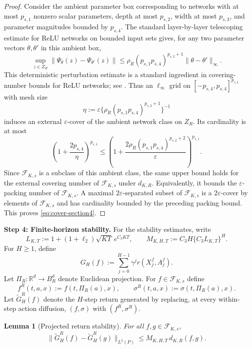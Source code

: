 \documentclass{article}
\newtheorem{lem}[thm]{Lemma}
\newcommand{\1}{\mathbbm{1}}
\numberwithin{equation}{section}
\def\to{\rightarrow}
\begin{document}
\begin{proof}
Consider the ambient parameter box corresponding to networks with at most \(p_{s,1}\) nonzero scalar parameters, depth at most \(p_{s,2}\), width at most \(p_{s,3}\), and parameter magnitudes bounded by \(p_{s,4}\). The standard layer-by-layer telescoping estimate for ReLU networks on bounded input sets gives, for any two parameter vectors \(\theta,\theta'\) in this ambient box,
\begin{equation}
\label{eq:param-lip-section4}
 \sup_{z\in Z_R}\|\Psi_\theta(z)-\Psi_{\theta'}(z)\|
 \le
 \rho_R(p_{s,1}p_{s,4})^{p_{s,2}+1}\|\theta-\theta'\|_\infty.
\end{equation}
This deterministic perturbation estimate is a standard ingredient in covering-number bounds for ReLU networks; see \cite{bartlett2019nearly,petersen2018optimal}.
Thus an \(\ell_\infty\) grid on \([-p_{s,4},p_{s,4}]^{p_{s,1}}\) with mesh size
\[
 \eta:=\varepsilon\{\rho_R(p_{s,1}p_{s,4})^{p_{s,2}+1}\}^{-1}
\]
 induces an external \(\varepsilon\)-cover of the ambient network class on \(Z_R\). Its cardinality is at most
\[
 \left(1+\frac{2p_{s,4}}{\eta}\right)^{p_{s,1}}
 \le
 \left(1+\frac{2\rho_R(p_{s,1}p_{s,4})^{p_{s,2}+2}}{\varepsilon}\right)^{p_{s,1}}.
\]
Since \(\mathcal F_{K,s}\) is a subclass of this ambient class, the same upper bound holds for the external covering number of \(\mathcal F_{K,s}\) under \(d_{K,R}\). Equivalently, it bounds the \(\varepsilon\)-packing number of \(\mathcal F_{K,s}\). A maximal \(2\varepsilon\)-separated subset of \(\mathcal F_{K,s}\) is a \(2\varepsilon\)-cover by elements of \(\mathcal F_{K,s}\) and has cardinality bounded by the preceding packing bound. This proves \eqref{eq:cover-section4}.
\end{proof}

\medskip
\noindent\textbf{Step 4: Finite-horizon stability.}
For the stability estimates, write
\[
L_{K,T}:=
1+(1+\ell_2)\sqrt{KT}\,e^{C_3KT},
\qquad
M_{K,H,T}:=
C_3H\{C_3L_{K,T}\}^{H}.
\]
For \(H\ge1\), define
\[
 G_H(f):=\sum_{j=0}^{H-1}\gamma^j r(X^f_j,A^f_j).
\]
Let \(\Pi_R:\mathbb R^d\to B_R^d\) denote Euclidean projection. For \(f\in\mathcal F_{K,s}\) define
\[
 f^R(t,a,x):=f(t,\Pi_R(a),x),
 \qquad
 \sigma^R(t,a,x):=\sigma(t,\Pi_R(a),x).
\]
Let \(\widetilde G_H^R(f)\) denote the \(H\)-step return generated by replacing, at every within-step action diffusion, \((f,\sigma)\) with \((f^R,\sigma^R)\).

\begin{lem}[Projected return stability]
\label{lem:proj-section4}
For all \(f,g\in\mathcal F_{K,s}\),
\begin{equation}
\label{eq:proj-section4}
 \|\widetilde G_H^R(f)-\widetilde G_H^R(g)\|_{L^2(P)}
 \le
 M_{K,H,T}\, d_{K,R}(f,g).
\end{equation}
\end{lem}
\end{document}
